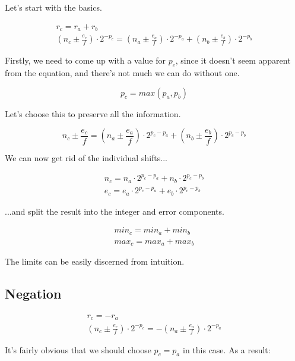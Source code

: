 \documentclass[10pt,a4paper]{article}
\numberwithin{equation}{section}
\numberwithin{equation}{subsection}
\begin{document}
	Let's start with the basics.
	
	\begin{eqnarray}
	r_c = r_a + r_b \\
	(n_c \pm \frac{e_c}{f})\cdot 2^{-p_c} = (n_a \pm \frac{e_a}{f})\cdot 2^{-p_a} + (n_b \pm \frac{e_b}{f})\cdot 2^{-p_b}
	\end{eqnarray}
	
	Firstly, we need to come up with a value for $p_c$, since it doesn't seem apparent from the equation, and there's not much we can do without one. 
	
	\begin{equation}
	p_c = max(p_a, p_b)
	\end{equation}
	
	Let's choose this to preserve all the information.
	
	\begin{equation}
	n_c \pm \frac{e_c}{f} = (n_a \pm \frac{e_a}{f})\cdot 2^{p_c-p_a} + (n_b \pm \frac{e_b}{f})\cdot 2^{p_c-p_b}
	\end{equation}
	
	We can now get rid of the individual shifts...
	
	\begin{eqnarray}
	n_c = n_a\cdot 2^{p_c-p_a} + n_b\cdot 2^{p_c-p_b} \\
	e_c = e_a\cdot 2^{p_c-p_a} + e_b\cdot 2^{p_c-p_b}
	\end{eqnarray}
	
	...and split the result into the integer and error components.
	
	\begin{eqnarray}
	min_c = min_a + min_b \\
	max_c = max_a + max_b
	\end{eqnarray}
	
	The limits can be easily discerned from intuition.
	
	\subsection{Negation}
	
	\begin{eqnarray}
	r_c = -r_a \\
	(n_c \pm \frac{e_c}{f})\cdot 2^{-p_c} = -(n_a \pm \frac{e_a}{f})\cdot 2^{-p_a}
	\end{eqnarray}
	
	It's fairly obvious that we should choose $p_c = p_a$ in this case. As a result:
	
\end{document}

